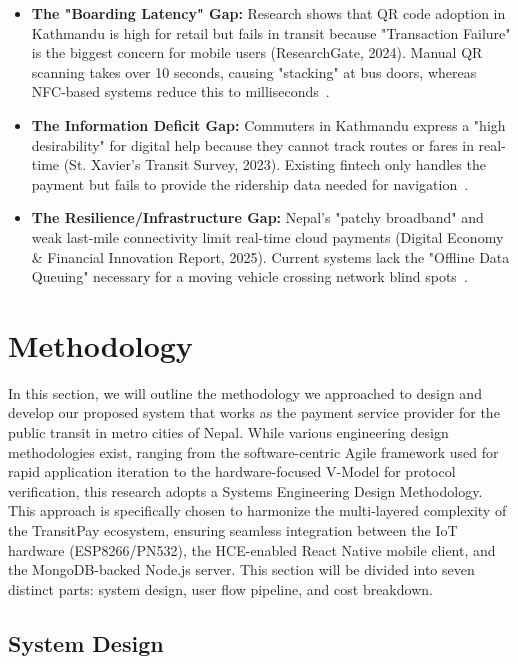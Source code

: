 \documentclass[sigconf, nonacm]{acmart}
\begin{document}
\begin{itemize}
    \item \textbf{The "Boarding Latency" Gap:} Research shows that QR code adoption in Kathmandu is high for retail but fails in transit because "Transaction Failure" is the biggest concern for mobile users (ResearchGate, 2024). Manual QR scanning takes over 10 seconds, causing "stacking" at bus doors, whereas NFC-based systems reduce this to milliseconds~\cite{harnaningrum2024comparison}.

    \item \textbf{The Information Deficit Gap:} Commuters in Kathmandu express a "high desirability" for digital help because they cannot track routes or fares in real-time (St. Xavier's Transit Survey, 2023). Existing fintech only handles the payment but fails to provide the ridership data needed for navigation~\cite{ghimire2023issues}.

    \item \textbf{The Resilience/Infrastructure Gap:} Nepal’s "patchy broadband" and weak last-mile connectivity limit real-time cloud payments (Digital Economy \& Financial Innovation Report, 2025). Current systems lack the "Offline Data Queuing" necessary for a moving vehicle crossing network blind spots~\cite{kharel2025digital}.
\end{itemize}

\section{Methodology}

In this section, we will outline the methodology we approached to design and develop our proposed system that works as the payment service provider for the public transit in metro cities of Nepal.  While various engineering design methodologies exist, ranging from the software-centric Agile framework used for rapid application iteration to the hardware-focused V-Model for protocol verification, this research adopts a Systems Engineering Design Methodology. This approach is specifically chosen to harmonize the multi-layered complexity of the TransitPay ecosystem, ensuring seamless integration between the IoT hardware (ESP8266/PN532), the HCE-enabled React Native mobile client, and the MongoDB-backed Node.js server. This section will be divided into seven distinct parts: system design, user flow pipeline, and cost breakdown.

\subsection{System Design}
\end{document}
